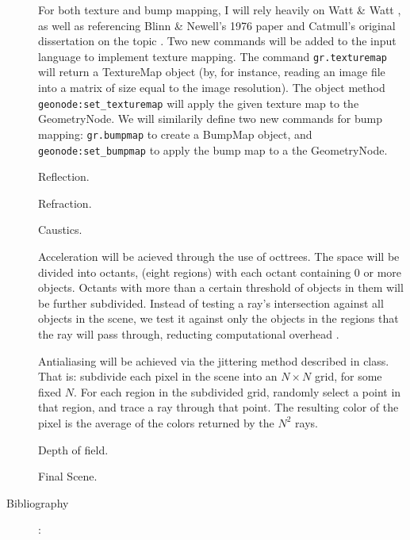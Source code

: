 \documentclass {article}
\begin{document}
\begin{description}
    For both texture and bump mapping, I will rely heavily on Watt \& Watt \cite{WattMapping}, as well as referencing Blinn \& Newell's 1976 paper \cite{Blinn} and Catmull's original dissertation on the topic \cite{Catmull}. Two new commands will be added to the input language to implement texture mapping. The command \texttt{gr.texturemap} will return a TextureMap object (by, for instance, reading an image file into a matrix of size equal to the image resolution). The object method \texttt{geonode:set\_texturemap} will apply the given texture map to the GeometryNode. We will similarily define two new commands for bump mapping: \texttt{gr.bumpmap} to create a BumpMap object, and \texttt{geonode:set\_bumpmap} to apply the bump map to a the GeometryNode.
    
    Reflection.
    
    Refraction.
    
    Caustics.
    
    Acceleration will be acieved through the use of octtrees. The space will be divided into octants, (eight regions) with each octant containing $0$ or more objects. Octants with more than a certain threshold of objects in them will be further subdivided. Instead of testing a ray's intersection against all objects in the scene, we test it against only the objects in the regions that the ray will pass through, reducting computational overhead \cite{WattOct}.

    Antialiasing will be achieved via the jittering method described in class. That is: subdivide each pixel in the scene into an $N\times N$ grid, for some fixed $N$. For each region in the subdivided grid, randomly select a point in that region, and trace a ray through that point. The resulting color of the pixel is the average of the colors returned by the $N^2$ rays.
    
    Depth of field.
    
    Final Scene.

\item[Bibliography]:

\begingroup
\renewcommand{\section}[2]{}%
\begin{thebibliography}{9}




\end{thebibliography}
\end{description}
\end{document}
